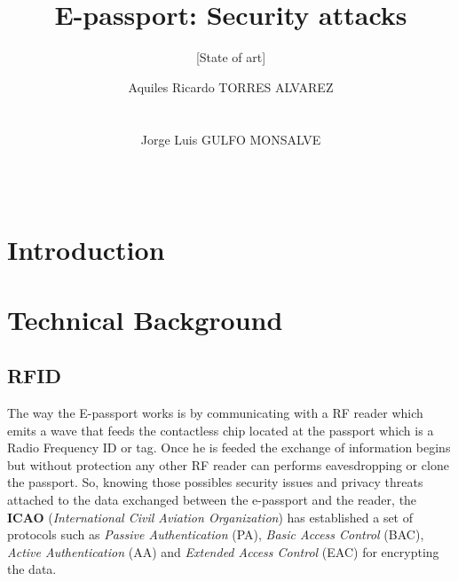\documentclass{acm_proc_article-sp}
\begin{document}
\title{E-passport: Security attacks}
\subtitle{[State of art]}

\author{
\alignauthor
Aquiles Ricardo TORRES ALVAREZ\\
       \\
       \\
\alignauthor
Jorge Luis GULFO MONSALVE\\
       \\
       \\
}

\maketitle
\begin{abstract}

\end{abstract}



\section{Introduction}

\section{Technical Background}

\subsection{RFID}
The way the E-passport works is by communicating with a RF reader which emits a wave that feeds 
the contactless chip located at the passport which is a Radio Frequency ID or tag. Once he is feeded the exchange of information begins but 
without protection any other RF reader can performs eavesdropping or clone the passport. So, knowing those possibles security issues and privacy threats attached to
the data exchanged between the e-passport and the reader, the \textbf{ICAO} 
(\textit{International Civil Aviation Organization}) has 
established a set of protocols such as \textit{Passive Authentication} (PA), \textit{Basic Access Control} (BAC), 
\textit{Active Authentication} (AA) and \textit{Extended Access Control} (EAC) for encrypting the data.
\end{document}
